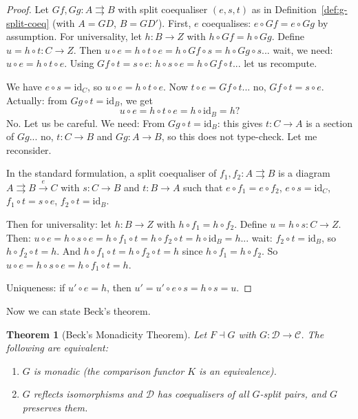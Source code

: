 \documentclass[a4paper,12pt]{book}
\newcommand{\id}{\mathrm{id}}
\theoremstyle{definition}
\theoremstyle{plain}
\newtheorem{theorem}[definition]{Theorem}
\theoremstyle{remark}
\begin{document}
\begin{proof}
Let $Gf,Gg\colon A\rightrightarrows B$ with split coequaliser $(e,s,t)$
as in Definition~\ref{def:g-split-coeq} (with $A=GD$, $B=GD'$).
First, $e$ coequalises: $e\circ Gf = e\circ Gg$ by assumption.
For universality, let $h\colon B\to Z$ with $h\circ Gf = h\circ Gg$.
Define $u = h\circ t\colon C\to Z$.  Then
$u\circ e = h\circ t\circ e = h\circ Gf\circ s = h\circ Gg\circ s$...
wait, we need: $u\circ e = h\circ t\circ e$.  Using $Gf\circ t = s\circ e$:
$h\circ s\circ e = h\circ Gf\circ t$... let us recompute.

We have $e\circ s = \id_C$, so $u\circ e = h\circ t\circ e$.
Now $t\circ e = Gf\circ t$... no, $Gf\circ t = s\circ e$.
Actually: from $Gg\circ t = \id_B$, we get
\[
    u\circ e = h\circ t\circ e = h\circ\id_B = h?
\]
No. Let us be careful.  We need:
From $Gg\circ t = \id_B$: this gives $t\colon C\to A$ is a section of
$Gg$... no, $t\colon C\to B$ and $Gg\colon A\to B$, so this does
not type-check.  Let me reconsider.

In the standard formulation, a split coequaliser of $f_1,f_2\colon A\rightrightarrows B$
is a diagram $A\rightrightarrows B\xrightarrow{e} C$ with
$s\colon C\to B$ and $t\colon B\to A$ such that
$e\circ f_1 = e\circ f_2$, $e\circ s = \id_C$,
$f_1\circ t = s\circ e$, $f_2\circ t = \id_B$.

Then for universality: let $h\colon B\to Z$ with $h\circ f_1 = h\circ f_2$.
Define $u = h\circ s\colon C\to Z$.  Then:
$u\circ e = h\circ s\circ e = h\circ f_1\circ t = h\circ f_2\circ t
= h\circ\id_B^{} = h$... wait: $f_2\circ t = \id_B$, so
$h\circ f_2\circ t = h$.  And $h\circ f_1\circ t = h\circ f_2\circ t = h$
since $h\circ f_1 = h\circ f_2$.  So $u\circ e = h\circ s\circ e
= h\circ f_1\circ t = h$.

Uniqueness: if $u'\circ e = h$, then $u' = u'\circ e\circ s = h\circ s = u$.
\end{proof}

Now we can state Beck's theorem.

\begin{theorem}[Beck's Monadicity Theorem]\label{thm:beck}
Let $F\dashv G$ with $G\colon\mathcal{D}\to\mathcal{C}$.
The following are equivalent:
\begin{enumerate}[label=(\roman*)]
\item $G$ is monadic (the comparison functor $K$ is an equivalence).
\item $G$ reflects isomorphisms and $\mathcal{D}$ has coequalisers of
    all $G$-split pairs, and $G$ preserves them.
\end{enumerate}
\end{theorem}
\end{document}
